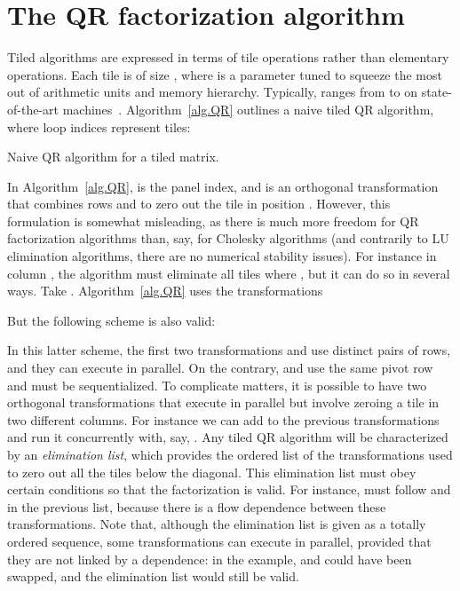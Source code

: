 \documentclass[a4paper,twopages]{article}
\begin{document}
\section{The QR factorization algorithm}
\label{sec.QR}

Tiled algorithms are expressed in terms of tile operations rather than
elementary operations.  Each tile is of size , where  is a
parameter tuned to squeeze the most out of arithmetic units and memory
hierarchy. Typically,  ranges from  to  on state-of-the-art
machines~\cite{sc09-agullo}. Algorithm~\ref{alg.QR} outlines a naive tiled QR
algorithm, where loop indices represent tiles:

\begin{algorithm}[htbp]
  \DontPrintSemicolon
\caption{Naive QR algorithm for a tiled  matrix.}
\label{alg.QR}
\end{algorithm}

In Algorithm~\ref{alg.QR},  is the panel index, and 
is an orthogonal transformation that combines rows  and  to zero
out the tile in position . However, this formulation is somewhat
misleading, as there is much more freedom for QR factorization algorithms than,
say, for Cholesky algorithms (and contrarily to LU elimination algorithms,
there are no numerical stability issues).  For instance in column , the
algorithm must eliminate all tiles  where , but it can do so in
several ways. Take . Algorithm~\ref{alg.QR} uses the transformations

But the following scheme is also valid:

In this latter scheme, the first two transformations   and 
use distinct pairs of rows, and they can execute in parallel. On the contrary,  and
 use the same pivot row and must be sequentialized.
To complicate matters, it is possible to have two orthogonal transformations that execute in parallel
but involve zeroing a tile in two different columns. For instance we can add 
to the previous transformations and run it concurrently with, say, .
Any tiled QR algorithm will be characterized by an \emph{elimination list}, which provides
the ordered list of the transformations used to zero out all the tiles below the diagonal.
This elimination list must obey certain conditions so that the factorization is valid.
For instance,  must follow  and 
in the previous list, because there is a flow dependence between these transformations.
Note that, although the elimination list is given as a totally ordered sequence, some transformations can execute
in parallel, provided that they are not linked by a dependence: in the example,
 and   could have been swapped, and the elimination list
would still be valid.
\end{document}
